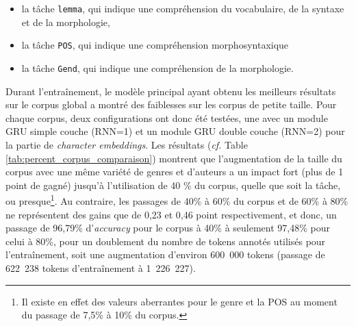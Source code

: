 \begin{itemize}
    \item la tâche \texttt{lemma}, qui indique une compréhension du vocabulaire, de la syntaxe et de la morphologie,
    \item la tâche \texttt{POS}, qui indique une compréhension morphosyntaxique
    \item la tâche \texttt{Gend}, qui indique une compréhension de la morphologie.
\end{itemize}

Durant l'entraînement, le modèle principal ayant obtenu les meilleurs résultats sur le corpus global a montré des faiblesses sur les corpus de petite taille. Pour chaque corpus, deux configurations ont donc été testées, une avec un module GRU simple couche (RNN=1) et un module GRU double couche (RNN=2) pour la partie de \textit{character embeddings}. Les résultats (\textit{cf.} Table \ref{tab:percent_corpus_comparaison}) montrent que l'augmentation de la taille du corpus avec une même variété de genres et d'auteurs a un impact fort (plus de 1 point de gagné) jusqu'à l'utilisation de 40 \% du corpus, quelle que soit la tâche, ou presque\footnote{Il existe en effet des valeurs aberrantes pour le genre et la POS au moment du passage de 7,5\% à 10\% du corpus.}. Au contraire, les passages de 40\% à 60\% du corpus et de 60\% à 80\% ne représentent des gains que de 0,23 et 0,46 point respectivement, et donc, un passage de 96,79\% d'\textit{accuracy} pour le corpus à 40\% à seulement 97,48\% pour celui à 80\%, pour un doublement du nombre de tokens annotés utilisés pour l'entraînement, soit une augmentation d'environ 600~000 tokens (passage de 622~238 tokens d'entraînement à 1~226~227).



